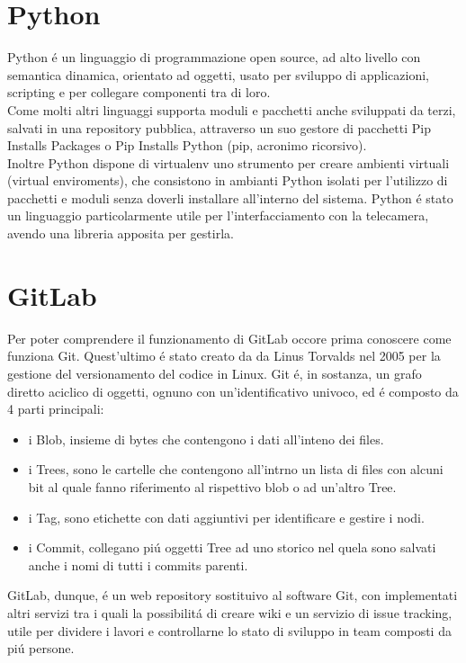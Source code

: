 \section{Python}
Python \'e un linguaggio di programmazione open source, ad alto livello con semantica dinamica, orientato ad oggetti, usato
per sviluppo di applicazioni, scripting e per collegare componenti tra di loro.\\[1\baselineskip]
Come molti altri linguaggi supporta moduli e pacchetti anche sviluppati da terzi, salvati in una repository pubblica,
attraverso un suo gestore di pacchetti Pip Installs Packages o Pip Installs Python (pip, acronimo ricorsivo).
\\[1\baselineskip]
Inoltre Python dispone di virtualenv uno strumento per creare ambienti virtuali (virtual enviroments), che consistono in ambianti Python
isolati per l'utilizzo di pacchetti e moduli senza doverli installare all'interno del sistema.
Python \'e stato un linguaggio particolarmente utile per l'interfacciamento con la telecamera, avendo una libreria
apposita per gestirla.
\\[2\baselineskip]

\section{GitLab}
Per poter comprendere il funzionamento di GitLab occore prima conoscere come funziona Git. Quest'ultimo \'e stato
creato da da Linus Torvalds nel 2005 per la gestione del versionamento del codice in Linux.
Git \'e, in sostanza, un grafo diretto aciclico di oggetti, ognuno con un'identificativo univoco, ed \'e composto da 4 parti principali:
\begin{itemize}
\item i Blob, insieme di bytes che contengono i dati all'inteno dei files.
\item i Trees, sono le cartelle che contengono all'intrno un lista di files con alcuni bit al quale fanno riferimento al
rispettivo blob o ad un'altro Tree.
\item i Tag, sono etichette con dati aggiuntivi per identificare e gestire i nodi.
\item i Commit, collegano pi\'u oggetti Tree ad uno storico nel quela sono salvati anche i nomi di tutti i commits parenti.
\end{itemize}
GitLab, dunque, \'e un web repository sostituivo al software Git, con implementati altri
servizi tra i quali la possibilit\'a di creare wiki e un servizio di issue tracking, utile
per dividere i lavori e controllarne lo stato di sviluppo in team composti da pi\'u persone.
